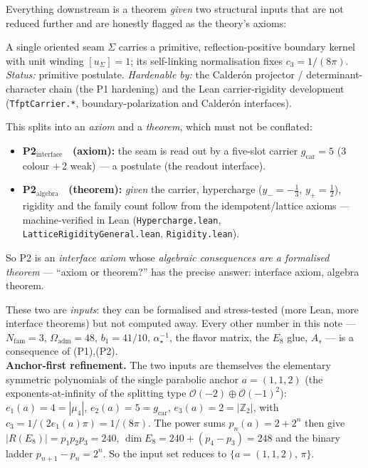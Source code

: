 \documentclass[11pt,a4paper]{article}
\newcommand{\gcar}{g_{\mathrm{car}}}
\newcommand{\Nfam}{N_{\mathrm{fam}}}
\newcommand{\Oadm}{\Omega_{\mathrm{adm}}}
\newcommand{\cthree}{c_3}
\newcommand{\ainv}{\alpha^{-1}_\star}
\newcommand{\Z}{\mathbb{Z}}
\theoremstyle{definition}
\begin{document}
\begin{keybox}
Everything downstream is a theorem \emph{given} two structural inputs that are not reduced further and
are honestly flagged as the theory's axioms:
\begin{description}[leftmargin=2.2em,style=nextline]
  \item[\textnormal{(P1) Boundary kernel.}] A single oriented seam $\Sigma$ carries a primitive,
  reflection-positive boundary kernel with unit winding $[u_\Sigma]=1$; its self-linking normalisation
  fixes $\cthree=1/(8\pi)$. \emph{Status:} primitive postulate. \emph{Hardenable by:} the Calder\'on
  projector / determinant-character chain (the P1 hardening) and the Lean carrier-rigidity development
  (\texttt{TfptCarrier.*}, boundary-polarization and Calder\'on interfaces).
  \item[\textnormal{(P2) Carrier interface.}] This splits into an \emph{axiom} and a \emph{theorem},
  which must not be conflated:
  \begin{itemize}\setlength\itemsep{1pt}
  \item \textbf{P2$_{\mathrm{interface}}$ \mO\ (axiom):} the seam is read out by a five-slot carrier
  $\gcar=5$ ($3$ colour $+\,2$ weak) --- a postulate (the readout interface).
  \item \textbf{P2$_{\mathrm{algebra}}$ \mE\ (theorem):} \emph{given} the carrier, hypercharge
  ($y_-=-\tfrac13$, $y_+=\tfrac12$), rigidity and the family count follow from the idempotent/lattice
  axioms --- machine-verified in Lean (\texttt{Hypercharge.lean}, \texttt{LatticeRigidityGeneral.lean},
  \texttt{Rigidity.lean}).
  \end{itemize}
  So P2 is an \emph{interface axiom} whose \emph{algebraic consequences are a formalised theorem} ---
  ``axiom or theorem?'' has the precise answer: interface axiom, algebra theorem.
\end{description}
These two are \emph{inputs}: they can be formalised and stress-tested (more Lean, more interface
theorems) but not computed away. Every other number in this note --- $\Nfam=3$, $\Oadm=48$,
$b_1=41/10$, $\ainv$, the flavor matrix, the $E_8$ glue, $A_s$ --- is a consequence of (P1),(P2).
\smallskip\\
\noindent\textbf{Anchor-first refinement.} The two inputs are themselves the elementary symmetric
polynomials of the single parabolic anchor $a=(1,1,2)$ (the exponents-at-infinity of the splitting type
$\mathcal O(-2)\oplus\mathcal O(-1)^2$): $e_1(a)=4=|\mu_4|$, $e_2(a)=5=\gcar$, $e_3(a)=2=|\Z_2|$, with
$\cthree=1/(2e_1(a)\pi)=1/(8\pi)$. The power sums $p_n(a)=2+2^n$ then give $|R(E_8)|=p_1p_2p_3=240$,
$\dim E_8=240+(p_4{-}p_3)=248$ and the binary ladder $p_{n+1}{-}p_n=2^n$. So the input set reduces to
$\{a=(1,1,2),\,\pi\}$. 
\end{keybox}
\end{document}
